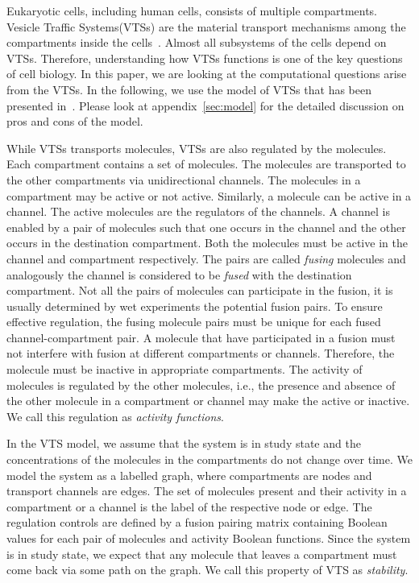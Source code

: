 Eukaryotic cells, including human cells, consists of multiple compartments.
%
Vesicle Traffic Systems(VTSs) are the material transport mechanisms
among the compartments inside the cells~\cite{vtsIntro}.
%
Almost all subsystems of the cells depend on VTSs.
%
Therefore, understanding how VTSs functions is one of the key
questions of cell biology.
%
In this paper, we are looking at the computational questions 
arise from the VTSs.
%
In the following, we use the model of VTSs that has been presented
in~\cite{VTS}.
%
Please look at appendix~\ref{sec:model}
for the detailed discussion on pros and cons of the model.

While VTSs transports molecules, VTSs are also
regulated by the molecules.
%
Each compartment contains a set of molecules.
%
The molecules are transported to the other compartments via
unidirectional channels.  
%
The molecules in a compartment may be active or not active.
%
Similarly, a molecule can be active in a channel. 
%
The active molecules are the regulators of the channels.
%
A channel is enabled by a pair of molecules
such that one occurs in the channel and the other
occurs in the destination compartment.
%
Both the molecules must be active in the channel
and compartment respectively.
%
The pairs are called {\em fusing} molecules and analogously
the channel is considered to be {\em fused} with the
destination compartment.
%
Not all the pairs of molecules can participate in the fusion, it is
usually determined by wet experiments the potential fusion pairs.
%
To ensure effective regulation, the fusing molecule pairs must be
unique for each fused channel-compartment pair.
%
A molecule that have participated in a fusion must not interfere
with fusion at different compartments or channels.
%
Therefore, the molecule must be inactive in appropriate compartments.
%
The activity of molecules is regulated by the other molecules, i.e.,
the presence and absence of the other molecule in a compartment or
channel may make the active or inactive.
%
We call this regulation as {\em activity functions}.

%
In the VTS model, we assume that the system is in study state and
the concentrations of the molecules in the compartments do not change over time.
%
We model the system as a labelled graph, where compartments are nodes and
transport channels are edges.
%
The set of molecules present and their activity in a compartment or
a channel is the label of the respective node or edge.
%
The regulation controls are defined by a fusion pairing matrix
containing Boolean values for each pair of molecules and activity
Boolean functions.
%
Since the system is in study state, we expect that any molecule that
leaves a compartment must come back via some path on the graph.
%
We call this property of VTS as {\em stability}.

